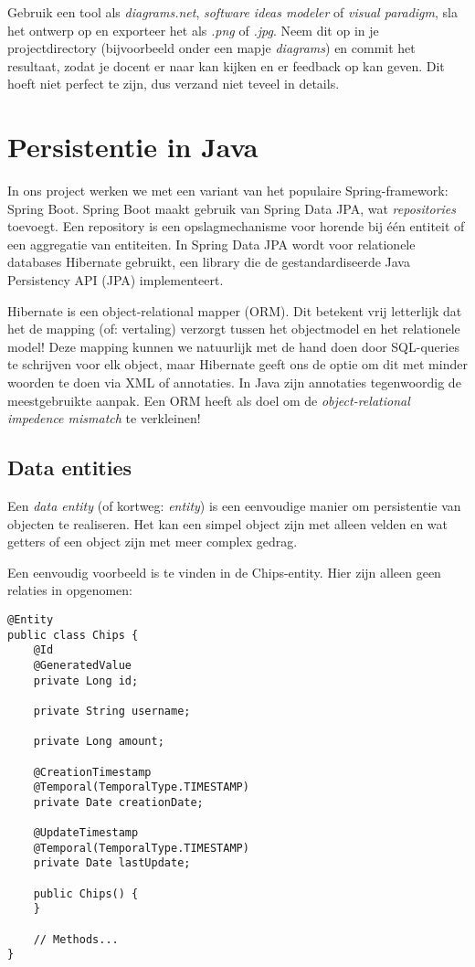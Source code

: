 Gebruik een tool als \textit{diagrams.net}, \textit{software ideas modeler} of \textit{visual paradigm},
sla het ontwerp op en exporteer het als \textit{.png} of \textit{.jpg}. 
Neem dit op in je projectdirectory (bijvoorbeeld onder een mapje \textit{diagrams})
en commit het resultaat, zodat je docent er naar kan kijken en er feedback op kan geven.
Dit hoeft niet perfect te zijn, dus verzand niet teveel in details.

\newpage
\section{Persistentie in Java}
In ons project werken we met een variant van het populaire Spring-framework:
Spring Boot. Spring Boot maakt gebruik van Spring Data JPA, wat \textit{repositories} toevoegt.
Een repository is een opslagmechanisme voor horende bij één entiteit of een aggregatie van entiteiten. 
In Spring Data JPA wordt voor relationele databases Hibernate gebruikt, 
een library die de gestandardiseerde Java Persistency API (JPA) implementeert.

Hibernate is een object-relational mapper (ORM). Dit betekent vrij letterlijk
dat het de mapping (of: vertaling) verzorgt tussen het objectmodel 
en het relationele model!
Deze mapping kunnen we natuurlijk met de hand doen 
door SQL-queries te schrijven voor elk object, maar Hibernate geeft ons de optie 
om dit met minder woorden te doen via XML of annotaties. In Java zijn 
annotaties tegenwoordig de meestgebruikte aanpak.
Een ORM heeft als doel om de 
\textit{object-relational impedence mismatch} te verkleinen!

\subsection{Data entities}
Een \textit{data entity} (of kortweg: \textit{entity}) is 
een eenvoudige manier om persistentie van objecten te realiseren. 
Het kan een simpel object zijn met alleen velden en wat getters
of een object zijn met meer complex gedrag. 

Een eenvoudig voorbeeld is te vinden in de Chips-entity.
Hier zijn alleen geen relaties in opgenomen:

\begin{verbatim}
@Entity
public class Chips {
    @Id
    @GeneratedValue
    private Long id;

    private String username;

    private Long amount;

    @CreationTimestamp
    @Temporal(TemporalType.TIMESTAMP)
    private Date creationDate;

    @UpdateTimestamp
    @Temporal(TemporalType.TIMESTAMP)
    private Date lastUpdate;

    public Chips() {
    }

    // Methods...
}
\end{verbatim}


